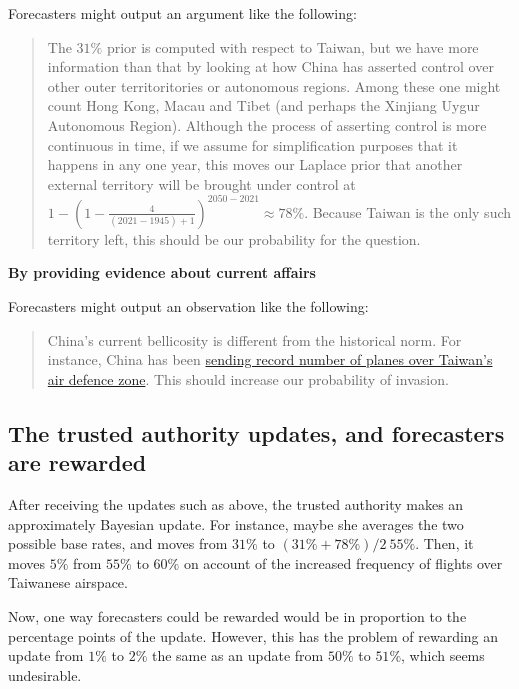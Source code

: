\documentclass[]{article}
\begin{document}
Forecasters might output an argument like the following:

\begin{quote}
The \(31\%\) prior is computed with respect to Taiwan, but we have more
information than that by looking at how China has asserted control over
other outer territoritories or autonomous regions. Among these one might
count Hong Kong, Macau and Tibet (and perhaps the Xinjiang Uygur
Autonomous Region). Although the process of asserting control is more
continuous in time, if we assume for simplification purposes that it
happens in any one year, this moves our Laplace prior that another
external territory will be brought under control at
\(1-(1-\frac{4}{(2021-1945)+1})^{2050-2021} \approx 78\%\). Because
Taiwan is the only such territory left, this should be our probability
for the question.
\end{quote}

\textbf{By providing evidence about current affairs}

Forecasters might output an observation like the following:

\begin{quote}
China's current bellicosity is different from the historical norm. For
instance, China has been
\href{https://www.bbc.co.uk/news/world-asia-58794094}{sending record
number of planes over Taiwan's air defence zone}. This should increase
our probability of invasion.
\end{quote}

\hypertarget{the-trusted-authority-updates-and-forecasters-are-rewarded}{%
\subsection{The trusted authority updates, and forecasters are
rewarded}\label{the-trusted-authority-updates-and-forecasters-are-rewarded}}

After receiving the updates such as above, the trusted authority makes
an approximately Bayesian update. For instance, maybe she averages the
two possible base rates, and moves from \(31\%\) to
\((31\% + 78\%)/2 ~ 55\%\). Then, it moves \(5\%\) from \(55\%\) to
\(60\%\) on account of the increased frequency of flights over Taiwanese
airspace.

Now, one way forecasters could be rewarded would be in proportion to the
percentage points of the update. However, this has the problem of
rewarding an update from \(1\%\) to \(2\%\) the same as an update from
\(50\%\) to \(51\%\), which seems undesirable.
\end{document}
